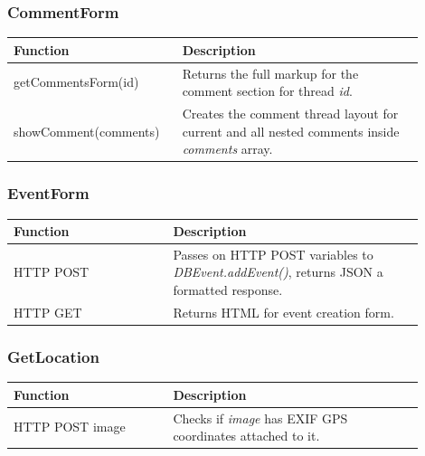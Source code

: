 \subsubsection{CommentForm}
\begin{minipage}{\linewidth}
  \centering
  \setlength{\tabcolsep}{12pt}
  \begin{tabular}{|p{0.35\linewidth}|p{0.55\linewidth}|}
  \hline
  \cellcolor{gray!25} Function & \cellcolor{gray!25} Description \\
  \hline
  getCommentsForm(id) & Returns the full markup for the comment section for thread \textit{id}. \\
  showComment(comments) & Creates the comment thread layout for current and all nested comments inside \textit{comments} array. \\
  \hline
  \end{tabular}
\end{minipage}

\subsubsection{EventForm}
\begin{minipage}{\linewidth}
  \centering
  \setlength{\tabcolsep}{12pt}
  \begin{tabular}{|p{0.35\linewidth}|p{0.55\linewidth}|}
  \hline
  \cellcolor{gray!25} Function & \cellcolor{gray!25} Description \\
  \hline
  HTTP POST & Passes on HTTP POST variables to \textit{DBEvent.addEvent()}, returns JSON a formatted response. \\
  HTTP GET & Returns HTML for event creation form. \\
  \hline
  \end{tabular}
\end{minipage}

\subsubsection{GetLocation}
\begin{minipage}{\linewidth}
  \centering
  \setlength{\tabcolsep}{12pt}
  \begin{tabular}{|p{0.35\linewidth}|p{0.55\linewidth}|}
  \hline
  \cellcolor{gray!25} Function & \cellcolor{gray!25} Description \\
  \hline
  HTTP POST image & Checks if \textit{image} has EXIF GPS coordinates attached to it. \\
  \hline
  \end{tabular}
\end{minipage}

